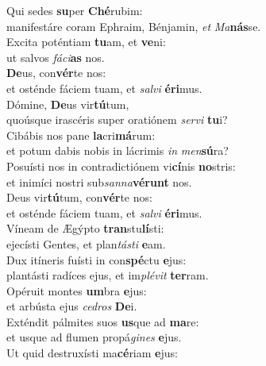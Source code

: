 \evenverse Qui sedes \textbf{su}per \textbf{Ché}rubim:~\*\\
\evenverse manifestáre coram Ephraim, Bénjamin, \textit{et} \textit{Ma}\textbf{nás}se.\\
\oddverse Excita poténtiam \textbf{tu}am, et \textbf{ve}ni:~\*\\
\oddverse ut salvos \textit{fá}\textit{ci}\textbf{as} nos.\\
\evenverse \textbf{De}us, con\textbf{vér}te nos:~\*\\
\evenverse et osténde fáciem tuam, et \textit{sal}\textit{vi} \textbf{é}\textbf{ri}mus.\\
\oddverse Dómine, \textbf{De}us vir\textbf{tú}tum,~\*\\
\oddverse quoúsque irascéris super oratiónem \textit{ser}\textit{vi} \textbf{tu}i?\\
\evenverse Cibábis nos pane \textbf{la}cri\textbf{má}rum:~\*\\
\evenverse et potum dabis nobis in lácrimis \textit{in} \textit{men}\textbf{sú}ra?\\
\oddverse Posuísti nos in contradictiónem vi\textbf{cí}nis \textbf{no}stris:~\*\\
\oddverse et inimíci nostri sub\textit{san}\textit{na}\textbf{vé}\textbf{runt} nos.\\
\evenverse Deus vir\textbf{tú}tum, con\textbf{vér}te nos:~\*\\
\evenverse et osténde fáciem tuam, et \textit{sal}\textit{vi} \textbf{é}\textbf{ri}mus.\\
\oddverse Víneam de Ægýpto \textbf{tran}stu\textbf{lí}sti:~\*\\
\oddverse ejecísti Gentes, et plan\textit{tá}\textit{sti} \textbf{e}am.\\
\evenverse Dux itíneris fuísti in con\textbf{spé}ctu \textbf{e}jus:~\*\\
\evenverse plantásti radíces ejus, et im\textit{plé}\textit{vit} \textbf{ter}ram.\\
\oddverse Opéruit montes \textbf{um}bra \textbf{e}jus:~\*\\
\oddverse et arbústa ejus \textit{ce}\textit{dros} \textbf{De}i.\\
\evenverse Exténdit pálmites suos \textbf{us}que ad \textbf{ma}re:~\*\\
\evenverse et usque ad flumen propá\textit{gi}\textit{nes} \textbf{e}jus.\\
\oddverse Ut quid destruxísti ma\textbf{cé}riam \textbf{e}jus:~\*\\
